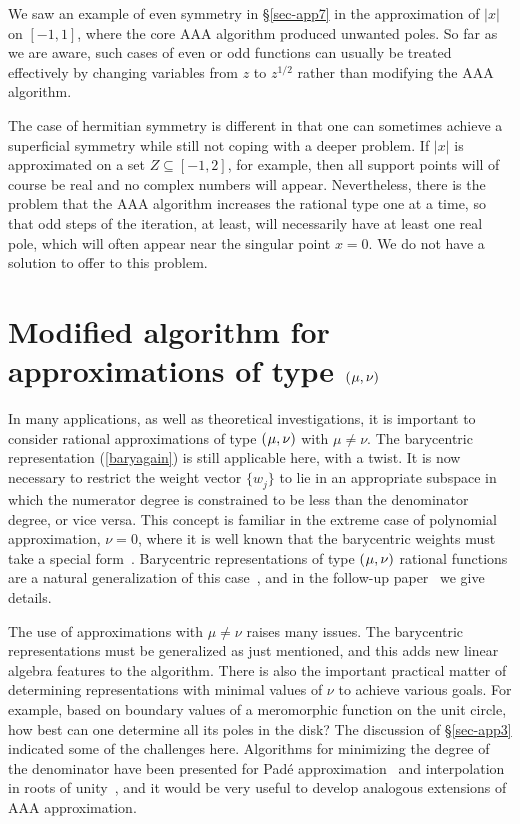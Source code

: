 \documentclass[final]{siamltex}
\begin{document}
We saw an example of even symmetry in \S\ref{sec-app7} in the
approximation of $|x|$ on $[-1,1]$, where the core AAA algorithm
produced unwanted poles.  So far as we are aware, such cases
of even or odd functions can usually be treated effectively by
changing variables from $z$ to $z^{1/2}$ rather than modifying
the AAA algorithm.

The case of hermitian symmetry is different in that one
can sometimes achieve a superficial symmetry while still not
coping with a deeper problem.  If $|x|$ is approximated on a set
$Z\subseteq [-1,2]$, for example, then all support points will of
course be real and no complex numbers will appear.  Nevertheless,
there is the problem that the AAA algorithm increases the rational
type one at a time, so that odd steps of the iteration, at least,
will necessarily have at least one real pole, which will often
appear near the singular point $x=0$.  We do not have a solution
to offer to this problem.

\section{\label{sec-munu}\boldmath Modified algorithm for
approximations of type $(\kern .5pt \mu,\nu)$} In many
applications, as well as theoretical investigations, it is
important to consider rational approximations of type $(\kern .5pt
\mu,\nu)$ with $\mu \ne \nu$.  The barycentric representation
(\ref{baryagain}) is still applicable here, with a twist.
It is now necessary to restrict the weight vector $\{w_j^{}\}$
to lie in an appropriate subspace in which the numerator
degree is constrained to be less than the denominator degree,
or vice versa.  This concept is familiar in the extreme case of
polynomial approximation, $\nu = 0$, where it is well known that
the barycentric weights must take a special form~\cite{bt}.
Barycentric representations of type $(\kern .5pt \mu,\nu)$
rational functions are a natural generalization of this
case~\cite[Sec.~3]{bbm}, and in the follow-up paper~\cite{fntb}
we give details.

The use of approximations with $\mu\ne \nu$ raises many issues.
The barycentric representations must be generalized as just
mentioned, and this adds new linear algebra features to
the algorithm.  There is also the important practical matter
of determining representations with minimal values of $\nu$
to achieve various goals.  For example, based on boundary
values of a meromorphic function on the unit circle, how best
can one determine all its poles in the disk?  The discussion
of \S\ref{sec-app3} indicated some of the challenges here.
Algorithms for minimizing the degree of the denominator have been
presented for Pad\'e approximation~\cite{ggt} and interpolation
in roots of unity~\cite{gpt}, and it would be very useful to
develop analogous extensions of AAA approximation.
\end{document}
